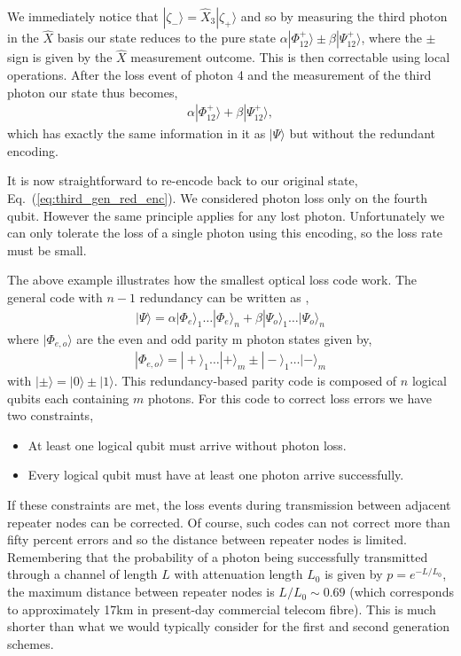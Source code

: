 \documentclass[twocolumn, aps, rmp, amsmath, amssymb, nofootinbib, superscriptaddress, longbibliography, floatfix, table-of-contents, eqsecnum]{revtex4-1}
\begin{document}
We immediately notice that $|\zeta_-\rangle=\hat{X}_3 |\zeta_+\rangle$ and so by measuring the third photon in the $\hat{X}$ basis our state reduces to the pure state $\alpha |\Phi_{12}^+\rangle \pm \beta |\Psi_{12}^+\rangle$, where the $\pm$ sign is given by the $\hat{X}$ measurement outcome. This is then correctable using local operations. After the loss event of photon 4 and the measurement of the third photon our state thus becomes,
\begin{align}
\alpha |\Phi_{12}^+\rangle + \beta  |\Psi_{12}^+\rangle,
\end{align}
which has exactly the same information in it as $|\Psi\rangle$ but without the redundant encoding.

It is now straightforward to re-encode back to our original state, Eq.~(\ref{eq:third_gen_red_enc}). We considered photon loss only on the fourth qubit. However the same principle applies for any lost photon. Unfortunately we can only tolerate the loss of a single photon using this encoding, so the loss rate must be small.

The above example illustrates how the smallest optical loss code work. The general code with \mbox{$n - 1$} redundancy can be written as \cite{bib:ralph05, bib:munro12},
\begin{align}
|\Psi\rangle = \alpha |\Phi_{e}\rangle_1 \ldots  |\Phi_{{e}}\rangle_n+\beta |\Psi_{o}\rangle_1 \ldots  |\Psi_{o}\rangle_n
\end{align}
where $|\Phi_{e,o}\rangle$ are the even and odd parity m photon states given by,
\begin{align}
|\Phi_{e,o}\rangle =  |+\rangle_1 \ldots  |+\rangle_m\pm |-\rangle_1 \ldots  |-\rangle_m
\end{align}
with \mbox{$|\pm\rangle=|0\rangle\pm |1\rangle$}. This redundancy-based parity code is composed of $n$ logical qubits each containing $m$ photons. For this code to correct loss errors we have two constraints,
\begin{itemize}
\item At least one logical qubit must arrive without photon loss.
\item Every logical qubit must have at least one photon arrive successfully.
\end{itemize}
If these constraints are met, the loss events during transmission between adjacent repeater nodes can be corrected. Of course, such codes can not correct more than fifty percent errors and so the distance between repeater nodes is limited. Remembering that the probability of a photon being successfully transmitted through a channel of length $L$ with attenuation length $L_0$ is given by \mbox{$p=e^{-L/L_0}$}, the maximum distance between repeater nodes is \mbox{$L/L_0\sim 0.69$} (which corresponds to approximately 17km in present-day commercial telecom fibre). This is much shorter than what we would typically consider for the first and second generation schemes.
\end{document}
